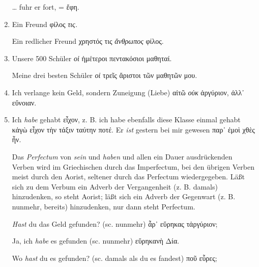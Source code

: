 \begin{enumerate}[leftmargin=0pt,rightmargin=0pt,listparindent =1cm,labelindent=1cm,labelsep=1ex,labelwidth={*},itemindent={*},align=left]
\begin{continuousitemline}
\ldots{} fuhr er fort, = \textgreek[variant=ancient]{ἔφη.}\par\end{continuousitemline}

\item Ein Freund \textgreek[variant=ancient]{φίλος \emph{τις.}}


\begin{continuousitemline}Ein redlicher Freund \textgreek[variant=ancient]{χρηστός
τις \emph{ἄνθρωπος} φίλος.}\par\end{continuousitemline}

\item Unsere 500 Schüler \textgreek[variant=ancient]{\emph{οἱ} ἡμέτεροι
πεντακόσιοι μαθηταί.}


\begin{continuousitemline}Meine drei besten Schüler \textgreek[variant=ancient]{\emph{οἱ}
τρεῖς ἄριστοι τῶν μαθητῶν μου.}\par\end{continuousitemline}

\item Ich verlange kein Geld, sondern Zuneigung (Liebe) \textgreek[variant=ancient]{αἰτῶ
\emph{οὐκ} ἀργύριον, ἀλλ᾽ εὔνοιαν.}
\item Ich \emph{habe} gehabt \textgreek[variant=ancient]{εἶχον,} z. B.
ich habe ebenfalls diese Klasse einmal gehabt \textgreek[variant=ancient]{κἀγὼ
εἶχον τὴν τάξιν ταύτην ποτέ.} Er \emph{ist} gestern bei mir gewesen
\textgreek[variant=ancient]{παρ᾽ ἐμοὶ χθὲς ἦν.}


Das \emph{Perfectum} von \emph{sein} und \emph{haben} und allen ein
Dauer ausdrückenden Verben wird im Griechischen durch das Imperfectum,
bei den übrigen Verben meist durch den Aorist, seltener durch das
Perfectum wiedergegeben. Läßt sich zu dem Verbum ein Adverb der Vergangenheit
(z. B. damals) hinzudenken, so steht Aorist; läßt sich ein Adverb
der Gegenwart (z. B. nunmehr, bereits) hinzudenken, nur dann steht
Perfectum.


\begin{continuousexamples}\emph{Hast} du das Geld gefunden? (\textlatin{sc.}
nunmehr) \textgreek[variant=ancient]{ἆρ᾽ εὕρηκας τἀργύριον;}


Ja, ich \emph{habe} es gefunden (\textlatin{sc.} nunmehr) \textgreek[variant=ancient]{εὕρηκανὴ
Δία.}


Wo \emph{hast} du es gefunden? (\textlatin{sc.} damals als du es fandest)
\textgreek[variant=ancient]{ποῦ εὗρες;}



\end{continuousexamples}
\end{enumerate}
